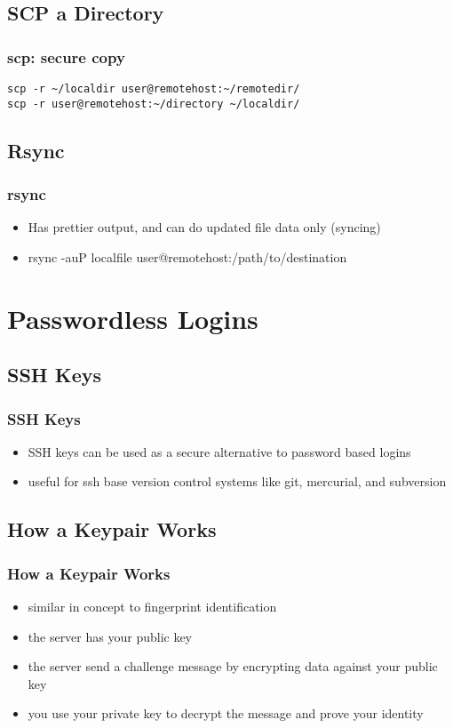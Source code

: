 \documentclass[hyperref={pdfpagelabels=false}]{beamer}
\begin{document}
\subsection{SCP a Directory}
\begin{frame}[fragile]
    \frametitle{scp: secure copy}
\begin{verbatim}
scp -r ~/localdir user@remotehost:~/remotedir/
scp -r user@remotehost:~/directory ~/localdir/
\end{verbatim}
\end{frame}
\subsection{Rsync}
\frame
{
    \frametitle{rsync}
    \begin{itemize}
    \item{Has prettier output, and can do updated file data only (syncing)}
    \item{rsync -auP localfile user@remotehost:/path/to/destination}
    \end{itemize}
}
\section{Passwordless Logins}
\subsection{SSH Keys}
\frame
{
    \frametitle{SSH Keys}
    \begin{itemize}
    \item{SSH keys can be used as a secure alternative to password based logins}
    \item{useful for ssh base version control systems like git, mercurial, and subversion}
    \end{itemize}
}
\subsection{How a Keypair Works}
\frame
{
    \frametitle{How a Keypair Works}
    \begin{itemize}
    \item{similar in concept to fingerprint identification}
    \item{the server has your public key}
    \item{the server send a challenge message by encrypting data against your public key}
    \item{you use your private key to decrypt the message and prove your identity}
    \end{itemize}
}
\end{document}
